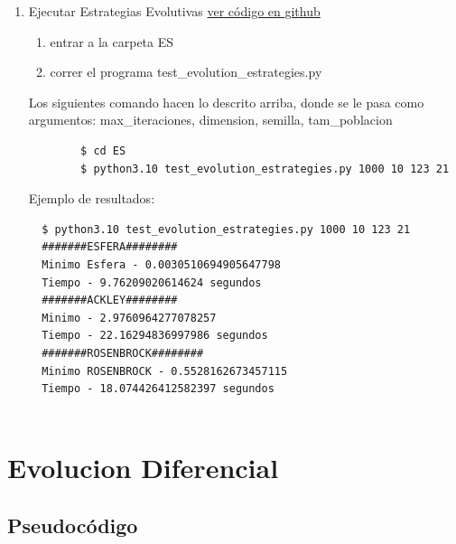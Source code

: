 \documentclass{article}
\begin{document}
\begin{enumerate} 
\item Ejecutar Estrategias Evolutivas
  \href{https://github.com/luisballado/InteligenciaComputacional/tree/master/code/tarea1/ES}{ver código en github}\\
  \begin{enumerate}
  \item entrar a la carpeta ES \\
  \item correr el programa test\_evolution\_estrategies.py\\
  \end{enumerate} 

  Los siguientes comando hacen lo descrito arriba, donde se le pasa como argumentos: max\_iteraciones, dimension, semilla, tam\_poblacion

  \begin{commandline}
     \begin{verbatim}
        $ cd ES
        $ python3.10 test_evolution_estrategies.py 1000 10 123 21
     \end{verbatim}
  \end{commandline}

  Ejemplo de resultados:
  \begin{commandline}
\begin{verbatim}
  $ python3.10 test_evolution_estrategies.py 1000 10 123 21
  #######ESFERA########
  Minimo Esfera - 0.0030510694905647798
  Tiempo - 9.76209020614624 segundos
  #######ACKLEY########
  Minimo - 2.9760964277078257
  Tiempo - 22.16294836997986 segundos
  #######ROSENBROCK########
  Minimo ROSENBROCK - 0.5528162673457115
  Tiempo - 18.074426412582397 segundos
  
\end{verbatim}
  \end{commandline}
\end{enumerate}


\newpage
\section{Evolucion Diferencial}
\subsection{Pseudocódigo}
\end{document}
